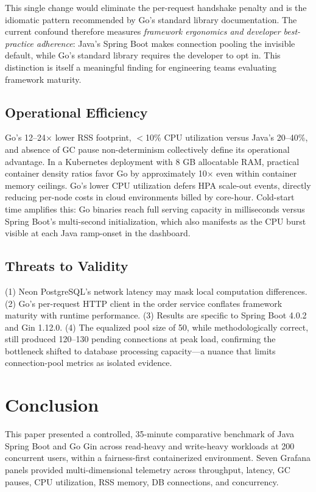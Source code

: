 \documentclass[conference]{IEEEtran}
\begin{document}
This single change would eliminate the per-request handshake penalty and is the idiomatic pattern recommended by Go's standard library documentation. The current confound therefore measures \textit{framework ergonomics and developer best-practice adherence}: Java's Spring Boot makes connection pooling the invisible default, while Go's standard library requires the developer to opt in. This distinction is itself a meaningful finding for engineering teams evaluating framework maturity.

\subsection{Operational Efficiency}

Go's 12--24$\times$ lower RSS footprint, $<$10\% CPU utilization versus Java's 20--40\%, and absence of GC pause non-determinism collectively define its operational advantage. In a Kubernetes deployment with 8 GB allocatable RAM, practical container density ratios favor Go by approximately 10$\times$ even within container memory ceilings. Go's lower CPU utilization defers HPA scale-out events, directly reducing per-node costs in cloud environments billed by core-hour. Cold-start time amplifies this: Go binaries reach full serving capacity in milliseconds versus Spring Boot's multi-second initialization, which also manifests as the CPU burst visible at each Java ramp-onset in the dashboard.

\subsection{Threats to Validity}

(1) Neon PostgreSQL's network latency may mask local computation differences. (2) Go's per-request HTTP client in the order service conflates framework maturity with runtime performance. (3) Results are specific to Spring Boot 4.0.2 and Gin 1.12.0. (4) The equalized pool size of 50, while methodologically correct, still produced 120--130 pending connections at peak load, confirming the bottleneck shifted to database processing capacity---a nuance that limits connection-pool metrics as isolated evidence.

\section{Conclusion}

This paper presented a controlled, 35-minute comparative benchmark of Java Spring Boot and Go Gin across read-heavy and write-heavy workloads at 200 concurrent users, within a fairness-first containerized environment. Seven Grafana panels provided multi-dimensional telemetry across throughput, latency, GC pauses, CPU utilization, RSS memory, DB connections, and concurrency.
\end{document}
